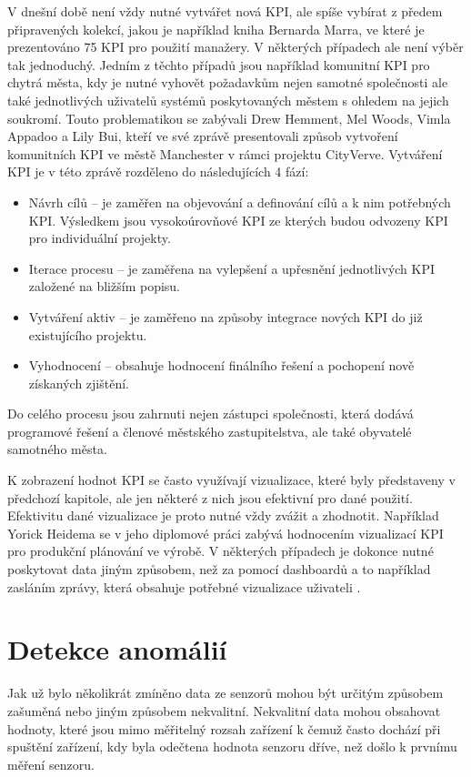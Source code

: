 V dnešní době není vždy nutné vytvářet nová KPI, ale spíše vybírat z předem připravených kolekcí, jakou je například kniha \cite{marr2012key} Bernarda Marra, ve které je prezentováno 75 KPI pro použití manažery. V některých případech ale není výběr tak jednoduchý. Jedním z těchto případů jsou například komunitní KPI pro chytrá města, kdy je nutné vyhovět požadavkům nejen samotné společnosti ale také jednotlivých uživatelů systémů poskytovaných městem s ohledem na jejich soukromí. Touto problematikou se zabývali Drew Hemment, Mel Woods, Vimla Appadoo a Lily Bui, kteří ve své zprávě \cite{hemment2016community} presentovali způsob vytvoření komunitních KPI ve městě Manchester v rámci projektu CityVerve. 
Vytváření KPI je v této zprávě rozděleno do následujících 4 fází:
\begin{itemize}
\item Návrh cílů -- je zaměřen na objevování a definování cílů a k nim potřebných KPI. Výsledkem jsou vysokoúrovňové KPI ze kterých budou odvozeny KPI pro individuální projekty.
\item Iterace procesu -- je zaměřena na vylepšení a upřesnění jednotlivých KPI založené na bližším popisu.
\item Vytváření aktiv -- je zaměřeno na způsoby integrace nových KPI do již existujícího projektu.
\item Vyhodnocení -- obsahuje hodnocení finálního řešení a pochopení nově získaných zjištění.
\end{itemize}
Do celého procesu jsou zahrnuti nejen zástupci společnosti, která dodává programové řešení a členové městského zastupitelstva, ale také obyvatelé samotného města.

K zobrazení hodnot KPI se často využívají vizualizace, které byly představeny v předchozí kapitole, ale jen některé z nich jsou efektivní pro dané použití. Efektivitu dané vizualizace je proto nutné vždy zvážit a zhodnotit. Například Yorick Heidema se v jeho diplomové práci \cite{heidema2018visualizing} zabývá hodnocením vizualizací KPI pro produkční plánování ve výrobě. V některých případech je dokonce nutné poskytovat data jiným způsobem, než za pomocí dashboardů a to například zasláním zprávy, která obsahuje potřebné vizualizace uživateli \cite{hemment2016community}.
\section{Detekce anomálií}
Jak už bylo několikrát zmíněno data ze senzorů mohou být určitým způsobem zašuměná nebo jiným způsobem nekvalitní. Nekvalitní data mohou obsahovat hodnoty, které jsou mimo měřitelný rozsah zařízení k čemuž často dochází při spuštění zařízení, kdy byla odečtena hodnota senzoru dříve, než došlo k prvnímu měření senzoru. 

